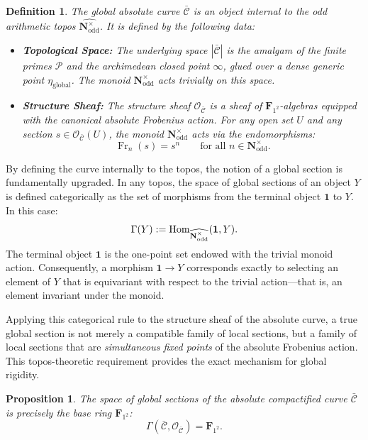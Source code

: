 \documentclass[11pt,a4paper]{article}
\let\mathscr\mathscr
\newtheorem{proposition}[theorem]{Proposition}
\newtheorem{definition}[theorem]{Definition}
\newcommand{\N}{\mathbf{N}}
\newcommand{\Ftwo}{\mathbf{F}_{1^2}}
\newcommand{\frob}{{\operatorname{Fr}}}
\newcommand{\Hom}{{\rm{Hom}}}
\begin{document}
\begin{definition}\label{def:absolute_curve}
The global absolute curve $\bar{\mathscr{C}}$ is an object internal to the odd arithmetic topos $\widehat{\N^\times_{\text{odd}}}$. It is defined by the following data:
\begin{itemize}
    \item \textbf{Topological Space:} The underlying space $|\bar{\mathscr{C}}|$ is the amalgam of the finite primes $\mathcal{P}$ and the archimedean closed point $\infty$, glued over a dense generic point $\eta_{\text{global}}$. The monoid $\N^\times_{\text{odd}}$ acts trivially on this  space.
    \item \textbf{Structure Sheaf:} The structure sheaf $\mathcal{O}_{\bar{\mathscr{C}}}$ is a sheaf of $\Ftwo$-algebras equipped with the canonical absolute Frobenius action. For any open set $U$ and any section $s \in \mathcal{O}_{\bar{\mathscr{C}}}(U)$, the monoid $\N^\times_{\text{odd}}$ acts via the endomorphisms:
    \begin{equation*}
    \frob_n(s) = s^n \qquad \text{for all } n \in \N^\times_{\text{odd}}.
    \end{equation*}
\end{itemize}
\end{definition}

By defining the curve internally to the topos, the notion of a global section is fundamentally upgraded. In any topos, the space of global sections of an object $Y$ is defined categorically as the set of morphisms from the terminal object $\mathbf{1}$ to $Y$. In this case:
\begin{equation*}
\Gamma(Y) := \Hom_{\widehat{\N^\times_{\text{odd}}}}(\mathbf{1}, Y).
\end{equation*}
The terminal object $\mathbf{1}$ is the one-point set endowed with the trivial monoid action. Consequently, a morphism $\mathbf{1} \to Y$ corresponds exactly to selecting an element of $Y$ that is equivariant with respect to the trivial action—that is, an element invariant under the monoid. 

Applying this categorical rule to the structure sheaf of the absolute curve, a true global section is not merely a compatible family of local sections, but a family of local sections that are \emph{simultaneous fixed points} of the absolute Frobenius action. This topos-theoretic requirement provides the exact mechanism for global rigidity.

\begin{proposition}\label{prop:global_sections_frobenius}
The space of global sections of the absolute compactified curve $\bar{\mathscr{C}}$ is precisely the base ring $\Ftwo$:
\begin{equation*}
\Gamma(\bar{\mathscr{C}}, \mathcal{O}_{\bar{\mathscr{C}}}) = \Ftwo.
\end{equation*}
\end{proposition}
\end{document}
